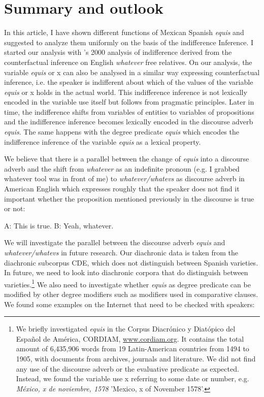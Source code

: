 \documentclass[output=paper
,modfonts
,nonflat]{langsci/langscibook}
\begin{document}
\section{Summary and outlook}\label{sec:kellert:6}
In this article, I have shown different functions of Mexican Spanish \textit{equis} and suggested to analyze them uniformly on the basis of the indifference Inference. I started our analysis with \citeauthor{Fintel2000}’s 2000 analysis of indifference derived from the counterfactual inference on English \textit{whatever} free relatives. On our analysis, the variable \textit{equis} or x can also be analysed in a similar way expressing counterfactual inference, i.e. the speaker is indifferent about which of the values of the variable \textit{equis} or x holds in the actual world. This indifference inference is not lexically encoded in the variable use itself but follows from pragmatic principles. Later in time, the indifference shifts from variables of entities to variables of propositions and the indifference inference becomes lexically encoded in the discourse adverb \textit{equis}. The same happens with the degree predicate \textit{equis} which encodes the indifference inference of the variable \textit{equis} as a lexical property.
 
We believe that there is a parallel between the change of \textit{equis} into a discourse adverb and the shift from \textit{whatever} as an indefinite pronoun (e.g. I grabbed whatever tool was in front of me) to \textit{whatever/whatevs} as discourse adverb in American English which expresses roughly that the speaker does not find it important whether the proposition mentioned previously in the discourse is true or not:

\ea
A: This is true. B: Yeah, whatever.
\z

We will investigate the parallel between the discourse adverb \textit{equis} and \textit{whatever/whatevs} in future research. Our diachronic data is taken from the diachronic subcorpus CDE, which does not distinguish between Spanish varieties. In future, we need to look into diachronic corpora that do distinguish between varieties.\footnote{We briefly investigated \textit{equis} in the Corpus Diacrónico y Diatópico del Español de América, CORDIAM, \href{http://www.cordiam.org}{www.cordiam.org}. It contains the total amount of 6,435,906 words from 19 Latin-American countries from 1494 to 1905, with documents from archives, journals and literature. We did not find any use of the discourse adverb or the evaluative predicate as expected. Instead, we found the variable use x referring to some date or number, e.g. \textit{México, x de noviembre, 1578} 'Mexico, x of November 1578'.}
We also need to investigate whether \textit{equis} as degree predicate can be modified by other degree modifiers such as modifiers used in comparative clauses. We found some examples on the Internet that need to be checked with speakers:
\end{document}
